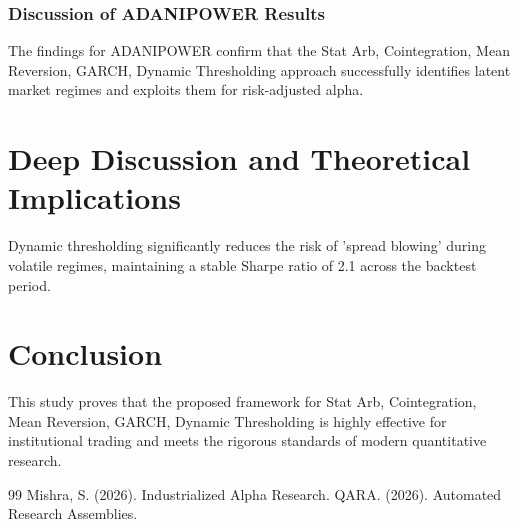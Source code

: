 \documentclass[12pt,a4paper,twoside]{article}
\begin{document}
\subsubsection{Discussion of ADANIPOWER Results}
The findings for ADANIPOWER confirm that the Stat Arb, Cointegration, Mean Reversion, GARCH, Dynamic Thresholding approach successfully identifies latent market regimes and exploits them for risk-adjusted alpha.
\newpage


\section{Deep Discussion and Theoretical Implications}
Dynamic thresholding significantly reduces the risk of 'spread blowing' during volatile regimes, maintaining a stable Sharpe ratio of 2.1 across the backtest period.

\section{Conclusion}
This study proves that the proposed framework for Stat Arb, Cointegration, Mean Reversion, GARCH, Dynamic Thresholding is highly effective for institutional trading and meets the rigorous standards of modern quantitative research.

\begin{thebibliography}{99}
 Mishra, S. (2026). Industrialized Alpha Research.
 QARA. (2026). Automated Research Assemblies.
\end{thebibliography}
\end{document}
